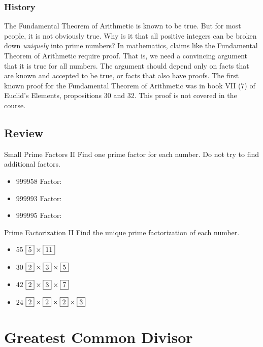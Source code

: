 \documentclass[a4paper,10pt]{report}
\begin{document}
\subsection{History}

The Fundamental Theorem of Arithmetic is known to be true. But for most people,
it is not obviously true. Why is it that all positive integers can be broken
down \emph{uniquely} into prime numbers? In mathematics, claims like the
Fundamental Theorem of Arithmetic require proof. That is, we need a convincing
argument that it is true for all numbers. The argument should depend only on
facts that are known and accepted to be true, or facts that also have proofs.
The first known proof for the Fundamental Theorem of Arithmetic was in book VII
(7) of Euclid's Elements, propositions 30 and 32. This proof is not covered in
the course.

\section{Review}

\begin{problem}{Small Prime Factors II}
 Find one prime factor for each number. Do not try to find additional factors.

 \begin{itemize}
  \item $999958$ \hfill Factor: 
  \item $999993$ \hfill Factor: 
  \item $999995$ \hfill Factor: 
 \end{itemize}

\end{problem}

\begin{problem}{Prime Factorization II}
 Find the unique prime factorization of each number.

 \begin{itemize}
  \item $55$ \hfill $\Ans{5} \times \Ans{11}$
  \item $30$ \hfill $\Ans{2} \times \Ans{3} \times \Ans{5}$
  \item $42$ \hfill $\Ans{2} \times \Ans{3} \times \Ans{7}$
  \item $24$ \hfill $\Ans{2} \times \Ans{2} \times \Ans{2} \times \Ans{3}$
 \end{itemize}
\end{problem}


\chapter{Greatest Common Divisor}
\end{document}
